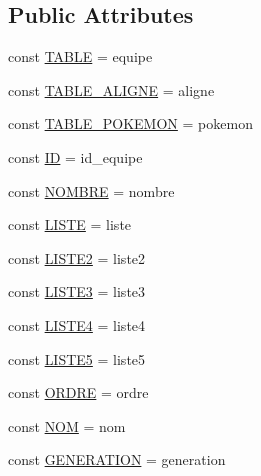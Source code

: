 \subsection*{Public Attributes}
\begin{DoxyCompactItemize}
\item 
const \hyperlink{class_coll_team_aad638b720ae1cd41ac6b28a3636c0ba3}{T\+A\+B\+LE} = \textquotesingle{}equipe\textquotesingle{}
\item 
const \hyperlink{class_coll_team_a6971e9d709a0e9a0040c66242a02a720}{T\+A\+B\+L\+E\+\_\+\+A\+L\+I\+G\+NE} = \textquotesingle{}aligne\textquotesingle{}
\item 
const \hyperlink{class_coll_team_aee5ec7da72b00967cb36924d84925816}{T\+A\+B\+L\+E\+\_\+\+P\+O\+K\+E\+M\+ON} = \textquotesingle{}pokemon\textquotesingle{}
\item 
const \hyperlink{class_coll_team_a2a09d3168ff4cf8d4ec181623e719414}{ID} = \textquotesingle{}id\+\_\+equipe\textquotesingle{}
\item 
const \hyperlink{class_coll_team_af7143bb7420640b79e58143fd31ba9fe}{N\+O\+M\+B\+RE} = \textquotesingle{}nombre\textquotesingle{}
\item 
const \hyperlink{class_coll_team_aed7f711bccca6110bc9446cfc1e1edb9}{L\+I\+S\+TE} = \textquotesingle{}liste\textquotesingle{}
\item 
const \hyperlink{class_coll_team_ad5d695c6603f6bc1a1035354bcf8ae1f}{L\+I\+S\+T\+E2} = \textquotesingle{}liste2\textquotesingle{}
\item 
const \hyperlink{class_coll_team_a652cc6c6a414c5124a17622287180572}{L\+I\+S\+T\+E3} = \textquotesingle{}liste3\textquotesingle{}
\item 
const \hyperlink{class_coll_team_ac9e8ce47ac50e0d139b686f4bae98089}{L\+I\+S\+T\+E4} = \textquotesingle{}liste4\textquotesingle{}
\item 
const \hyperlink{class_coll_team_a14b903cb4542fbac7708ce45a049c2f1}{L\+I\+S\+T\+E5} = \textquotesingle{}liste5\textquotesingle{}
\item 
const \hyperlink{class_coll_team_aa9e4c2a83ebfe02c04412f00b13e7f82}{O\+R\+D\+RE} = \textquotesingle{}ordre\textquotesingle{}
\item 
const \hyperlink{class_coll_team_ad3588d0cdb1e05e1034fa6f1d5f931d5}{N\+OM} = \textquotesingle{}nom\textquotesingle{}
\item 
const \hyperlink{class_coll_team_a693e0fa199df50328201823d6101a24d}{G\+E\+N\+E\+R\+A\+T\+I\+ON} = \textquotesingle{}generation\textquotesingle{}
\item 

\end{DoxyCompactItemize}
